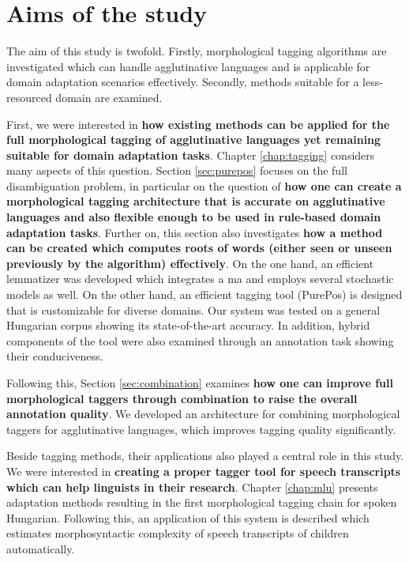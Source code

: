 \section{Aims of the study}

The aim of this study is twofold. 
Firstly, morphological tagging algorithms are investigated which can handle agglutinative languages and is applicable for domain adaptation scenarios effectively. 
Secondly, methods suitable for a less-resourced domain are examined.

First, we were interested in \textbf{how existing methods can be applied for the full morphological tagging of agglutinative languages yet remaining suitable for domain adaptation tasks}. 
Chapter \ref{chap:tagging} considers many aspects of this question. 
Section \ref{sec:purepos} focuses on the full disambiguation problem, in particular on the question of \textbf{how one can create a morphological tagging architecture that is accurate on agglutinative languages and also flexible enough to be used in rule-based domain adaptation tasks}.
Further on,  this section also investigates \textbf{how a method can be created which computes roots of words (either seen or unseen previously by the algorithm) effectively}. 
On the one hand, an efficient lemmatizer was developed which integrates a \gls{ma} and employs several stochastic models as well. %
On the other hand, an efficient tagging tool (PurePos) is designed that is customizable for diverse domains.
Our system was tested on a general Hungarian corpus showing its state-of-the-art accuracy. 
In addition, hybrid components of the tool were also examined through an annotation task showing their conduciveness.


Following this, Section \ref{sec:combination} examines \textbf{how one can improve full morphological taggers through combination to raise the overall annotation quality}.
We developed an architecture for combining morphological taggers for agglutinative languages, which improves tagging quality significantly.


Beside tagging methods, their applications also played a central role in this study.
We were interested in \textbf{creating a proper tagger tool for speech transcripts which can help linguists in their research}.
Chapter \ref{chap:mlu} presents adaptation methods resulting in the first morphological tagging chain for spoken Hungarian.
Following this, an application of this system is described which estimates morphosyntactic complexity of speech transcripts of children automatically.

